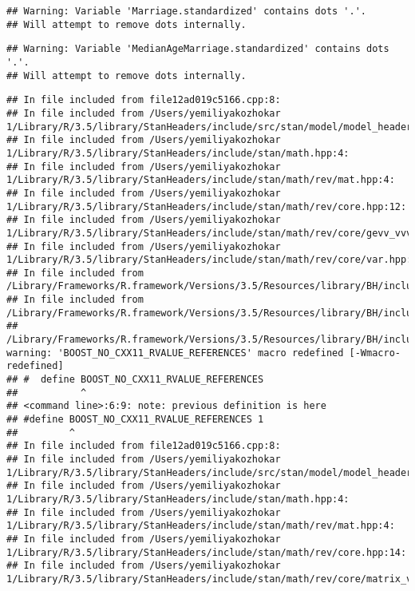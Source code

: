 \documentclass[]{article}
\begin{document}
\begin{verbatim}
## Warning: Variable 'Marriage.standardized' contains dots '.'.
## Will attempt to remove dots internally.
\end{verbatim}

\begin{verbatim}
## Warning: Variable 'MedianAgeMarriage.standardized' contains dots '.'.
## Will attempt to remove dots internally.
\end{verbatim}

\begin{verbatim}
## In file included from file12ad019c5166.cpp:8:
## In file included from /Users/yemiliyakozhokar 1/Library/R/3.5/library/StanHeaders/include/src/stan/model/model_header.hpp:4:
## In file included from /Users/yemiliyakozhokar 1/Library/R/3.5/library/StanHeaders/include/stan/math.hpp:4:
## In file included from /Users/yemiliyakozhokar 1/Library/R/3.5/library/StanHeaders/include/stan/math/rev/mat.hpp:4:
## In file included from /Users/yemiliyakozhokar 1/Library/R/3.5/library/StanHeaders/include/stan/math/rev/core.hpp:12:
## In file included from /Users/yemiliyakozhokar 1/Library/R/3.5/library/StanHeaders/include/stan/math/rev/core/gevv_vvv_vari.hpp:5:
## In file included from /Users/yemiliyakozhokar 1/Library/R/3.5/library/StanHeaders/include/stan/math/rev/core/var.hpp:7:
## In file included from /Library/Frameworks/R.framework/Versions/3.5/Resources/library/BH/include/boost/math/tools/config.hpp:13:
## In file included from /Library/Frameworks/R.framework/Versions/3.5/Resources/library/BH/include/boost/config.hpp:39:
## /Library/Frameworks/R.framework/Versions/3.5/Resources/library/BH/include/boost/config/compiler/clang.hpp:200:11: warning: 'BOOST_NO_CXX11_RVALUE_REFERENCES' macro redefined [-Wmacro-redefined]
## #  define BOOST_NO_CXX11_RVALUE_REFERENCES
##           ^
## <command line>:6:9: note: previous definition is here
## #define BOOST_NO_CXX11_RVALUE_REFERENCES 1
##         ^
## In file included from file12ad019c5166.cpp:8:
## In file included from /Users/yemiliyakozhokar 1/Library/R/3.5/library/StanHeaders/include/src/stan/model/model_header.hpp:4:
## In file included from /Users/yemiliyakozhokar 1/Library/R/3.5/library/StanHeaders/include/stan/math.hpp:4:
## In file included from /Users/yemiliyakozhokar 1/Library/R/3.5/library/StanHeaders/include/stan/math/rev/mat.hpp:4:
## In file included from /Users/yemiliyakozhokar 1/Library/R/3.5/library/StanHeaders/include/stan/math/rev/core.hpp:14:
## In file included from /Users/yemiliyakozhokar 1/Library/R/3.5/library/StanHeaders/include/stan/math/rev/core/matrix_vari.hpp:4:

\end{verbatim}
\end{document}
